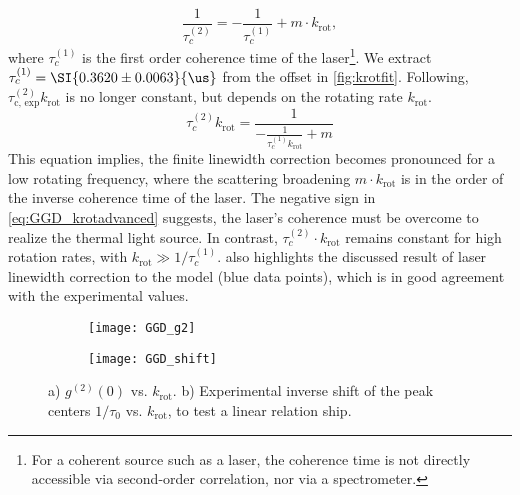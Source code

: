 \begin{equation}\label{eq:GGD_krotadvanced}
		\dfrac{1}{\tau_c^{(2)}}=-\dfrac{1}{\tau_c^{(1)}}+m\cdot k_\mathrm{rot},
\end{equation}
where $\tau_c^{(1)}$ is the first order coherence time of the laser\footnote{For a coherent source such as a laser, the coherence time is not directly accessible via second-order correlation, nor via a spectrometer.}. We extract $\tau_c^{(1)}=\SI{0.3620\pm0.0063}{\us}$ from the offset in \cref{fig:krotfit}. Following, $\tau_\mathrm{c,\, exp}^{(2)} k_\mathrm{rot}$ is no longer constant, but depends on the rotating rate $k_\mathrm{rot}$.
\begin{equation}\label{eq:krot_tauc_fit}
	\tau_c^{(2)} k_\mathrm{rot}=\dfrac{1}{-\frac{1}{\tau_c^{(1)}k_\mathrm{rot}}+m}
\end{equation}
This equation implies, the finite linewidth correction becomes pronounced for a low rotating frequency, where the scattering broadening $m\cdot k_\mathrm{rot}$ is in the order of the inverse coherence time of the laser. The negative sign in \cref{eq:GGD_krotadvanced} suggests, the laser's coherence must be overcome to realize the thermal light source. In contrast, $\tau_c^{(2)}\cdot k_\mathrm{rot}$ remains constant for high rotation rates, with $k_\mathrm{rot}\gg 1/\tau_c^{(1)}$.  also highlights the discussed result of laser linewidth correction to the model (blue data points), which is in good agreement with the experimental values.\\
\begin{figure}[htp]
	\centering
	\begin{subfigure}{0.49\textwidth}
		\centering
		\texttt{[image: GGD\_g2]}
		\caption{}
		\label{fig:GGD_g2}
	\end{subfigure}
	\hfill
	\begin{subfigure}{0.49\textwidth}
		\centering
		\texttt{[image: GGD\_shift]}
		\caption{}
		\label{fig:GGD_shift}
	\end{subfigure}
	\caption{a) $g^{(2)}(0)$ vs. $k_\mathrm{rot}$. b) Experimental inverse shift of the peak centers $1/\tau_0$ vs. $k_\mathrm{rot}$, to test a linear relation ship. }
\end{figure}
